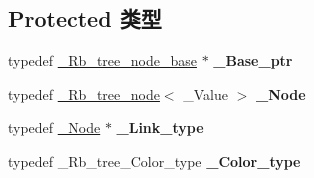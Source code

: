 \subsection*{Protected 类型}
\begin{DoxyCompactItemize}
\item 
\mbox{\label{class___rb__tree_a894dafe81be4e4d388e101c6ba1186c7}} 
typedef \hyperlink{struct___rb__tree__node__base}{\+\_\+\+Rb\+\_\+tree\+\_\+node\+\_\+base} $\ast$ {\bfseries \+\_\+\+Base\+\_\+ptr}
\item 
\mbox{\label{class___rb__tree_afd5f6d30267a9f18471e2403272b275c}} 
typedef \hyperlink{struct___rb__tree__node}{\+\_\+\+Rb\+\_\+tree\+\_\+node}$<$ \+\_\+\+Value $>$ {\bfseries \+\_\+\+Node}
\item 
\mbox{\label{class___rb__tree_ae9995afc839f722213b2e9f4683700c1}} 
typedef \hyperlink{struct___rb__tree__node}{\+\_\+\+Node} $\ast$ {\bfseries \+\_\+\+Link\+\_\+type}
\item 
\mbox{\label{class___rb__tree_a01684d3f5d0c8854cfab8320addef6a0}} 
typedef \+\_\+\+Rb\+\_\+tree\+\_\+\+Color\+\_\+type {\bfseries \+\_\+\+Color\+\_\+type}
\end{DoxyCompactItemize}
